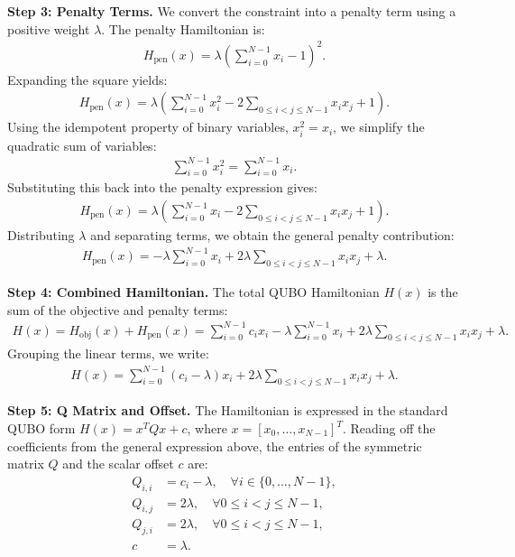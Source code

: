 \documentclass[12pt]{article}
\begin{document}
\textbf{Step 3: Penalty Terms.}
We convert the constraint into a penalty term using a positive weight $\lambda$. The penalty Hamiltonian is:
\begin{align}
    H_{\text{pen}}(x) = \lambda \left( \sum_{i=0}^{N-1} x_i - 1 \right)^2.
\end{align}
Expanding the square yields:
\begin{align}
    H_{\text{pen}}(x) = \lambda \left( \sum_{i=0}^{N-1} x_i^2 - 2 \sum_{0 \le i < j \le N-1} x_i x_j + 1 \right).
\end{align}
Using the idempotent property of binary variables, $x_i^2 = x_i$, we simplify the quadratic sum of variables:
\begin{align}
    \sum_{i=0}^{N-1} x_i^2 = \sum_{i=0}^{N-1} x_i.
\end{align}
Substituting this back into the penalty expression gives:
\begin{align}
    H_{\text{pen}}(x) = \lambda \left( \sum_{i=0}^{N-1} x_i - 2 \sum_{0 \le i < j \le N-1} x_i x_j + 1 \right).
\end{align}
Distributing $\lambda$ and separating terms, we obtain the general penalty contribution:
\begin{align}
    H_{\text{pen}}(x) = -\lambda \sum_{i=0}^{N-1} x_i + 2\lambda \sum_{0 \le i < j \le N-1} x_i x_j + \lambda.
\end{align}

\textbf{Step 4: Combined Hamiltonian.}
The total QUBO Hamiltonian $H(x)$ is the sum of the objective and penalty terms:
\begin{align}
    H(x) = H_{\text{obj}}(x) + H_{\text{pen}}(x) = \sum_{i=0}^{N-1} c_i x_i - \lambda \sum_{i=0}^{N-1} x_i + 2\lambda \sum_{0 \le i < j \le N-1} x_i x_j + \lambda.
\end{align}
Grouping the linear terms, we write:
\begin{align}
    H(x) = \sum_{i=0}^{N-1} (c_i - \lambda) x_i + 2\lambda \sum_{0 \le i < j \le N-1} x_i x_j + \lambda.
\end{align}

\textbf{Step 5: Q Matrix and Offset.}
The Hamiltonian is expressed in the standard QUBO form $H(x) = x^T Q x + c$, where $x = [x_0, \dots, x_{N-1}]^T$. Reading off the coefficients from the general expression above, the entries of the symmetric matrix $Q$ and the scalar offset $c$ are:
\begin{align}
    Q_{i,i} &= c_i - \lambda, \quad \forall i \in \{0, \dots, N-1\}, \\
    Q_{i,j} &= 2\lambda, \quad \forall 0 \le i < j \le N-1, \\
    Q_{j,i} &= 2\lambda, \quad \forall 0 \le i < j \le N-1, \\
    c &= \lambda.
\end{align}
\end{document}
